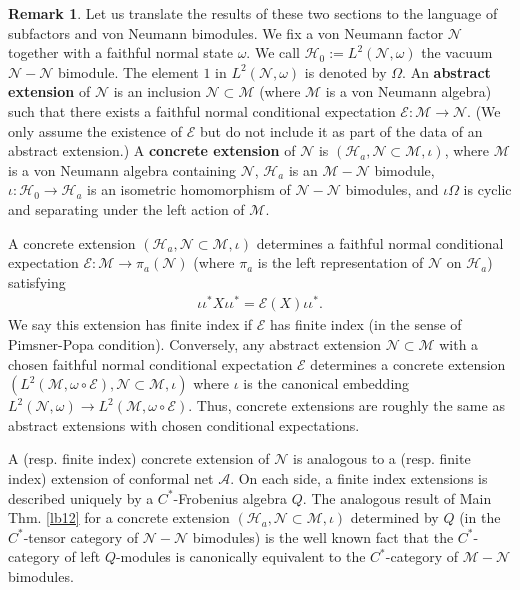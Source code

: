 \documentclass[11pt,b5paper,notitlepage]{article}
\theoremstyle{definition}
\newtheorem{rem}[df]{Remark}
\theoremstyle{plain}
\newcommand{\mc}{\mathcal}
\numberwithin{equation}{section}
\begin{document}
\begin{rem}\label{lb15}
Let us translate the results of these two sections to the language of subfactors and von Neumann bimodules. We fix a von Neumann factor $\mc N$ together with a faithful normal state $\omega$. We call $\mc H_0:=L^2(\mc N,\omega)$ the vacuum $\mc N-\mc N$ bimodule. The element $1$ in $L^2(\mc N,\omega)$ is denoted by $\Omega$. An \textbf{abstract extension} of $\mc N$ is an inclusion $\mc N\subset\mc M$ (where $\mc M$ is a von Neumann algebra) such that there exists a faithful normal conditional expectation $\mc E:\mc M\rightarrow\mc N$. (We only assume the existence of $\mc E$ but do not include it as part of the data of an abstract extension.) A \textbf{concrete extension} of $\mc N$ is $(\mc H_a,\mc N\subset\mc M,\iota)$, where $\mc M$ is a von Neumann algebra containing $\mc N$, $\mc H_a$ is an $\mc M-\mc N$ bimodule, $\iota:\mc H_0\rightarrow\mc H_a$ is an isometric homomorphism of $\mc N-\mc N$ bimodules, and $\iota\Omega$ is cyclic and separating under the left action of $\mc M$.

A concrete extension $(\mc H_a,\mc N\subset\mc M,\iota)$ determines a faithful normal conditional expectation $\mc E:\mc M\rightarrow\pi_a(\mc N)$ (where $\pi_a$ is the left representation of $\mc N$ on $\mc H_a$) satisfying
\begin{align*}
\iota\iota^* X\iota\iota^*=\mc E(X)\iota\iota^*.	
\end{align*}
We say this extension has finite index if $\mc E$ has finite index (in the sense of Pimsner-Popa condition). Conversely, any abstract extension $\mc N\subset \mc M$ with a chosen faithful normal conditional expectation $\mc E$ determines a concrete extension $(L^2(\mc M,\omega\circ\mc E),\mc N\subset\mc M,\iota)$ where $\iota$ is the canonical embedding $L^2(\mc N,\omega)\rightarrow L^2(\mc M,\omega\circ\mc E)$. Thus, concrete extensions are roughly the same as abstract extensions with chosen conditional expectations. 

A (resp. finite index) concrete extension of $\mc N$ is analogous to a (resp. finite index) extension of conformal net $\mc A$.  On each side, a finite index extensions is described uniquely by a $C^*$-Frobenius algebra $Q$. The analogous result of Main Thm. \ref{lb12} for a  concrete extension $(\mc H_a,\mc N\subset\mc M,\iota)$ determined by $Q$ (in the $C^*$-tensor category of $\mc N-\mc N$ bimodules) is the well known fact that the $C^*$-category of left $Q$-modules is canonically equivalent to the $C^*$-category of $\mc M-\mc N$ bimodules.


\end{rem}
\end{document}
